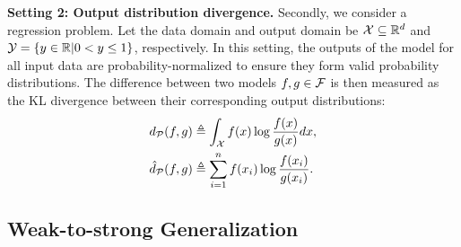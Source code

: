 \noindent \textbf{Setting 2: Output distribution divergence.} 
Secondly, we consider a regression problem.
Let the data domain and output domain be $\mathcal{X} \subseteq \mathbb{R}^d$ and $\mathcal{Y} = \{ y \in \mathbb{R}| 0 < y \le 1 \}$, respectively. 
In this setting, the outputs of the model for all input data are probability-normalized to ensure they form valid probability distributions. The difference between two models $f,g \in \mathcal{F}$ is then measured as the KL divergence between their corresponding output distributions:
\begin{align}
& d_\mathcal{P}(f,g) \triangleq \int_{\mathcal{X}} f(x) \log \frac{f(x)}{g(x)} d x, \label{def:kl_dist} \\
& \hat{d}_\mathcal{P}(f,g) \triangleq \sum_{i=1}^n f(x_i) \log \frac{f(x_i)}{g(x_i)}. \label{def:kl_dist_emp}
\end{align}









\subsection{Weak-to-strong Generalization}

